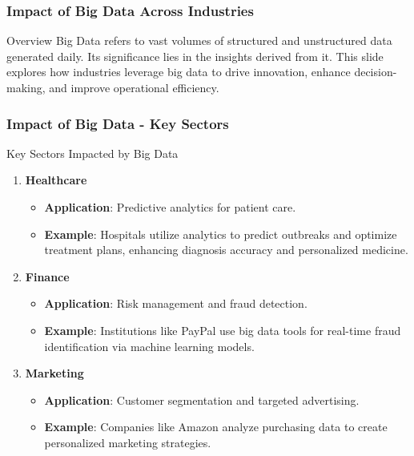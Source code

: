 \documentclass[aspectratio=169]{beamer}
\begin{document}
\begin{frame}[fragile]
    \frametitle{Impact of Big Data Across Industries}
    \begin{block}{Overview}
        Big Data refers to vast volumes of structured and unstructured data generated daily. Its significance lies in the insights derived from it. This slide explores how industries leverage big data to drive innovation, enhance decision-making, and improve operational efficiency.
    \end{block}
\end{frame}

\begin{frame}[fragile]
    \frametitle{Impact of Big Data - Key Sectors}
    \begin{block}{Key Sectors Impacted by Big Data}
        \begin{enumerate}
            \item \textbf{Healthcare}
                \begin{itemize}
                    \item \textbf{Application}: Predictive analytics for patient care.
                    \item \textbf{Example}: Hospitals utilize analytics to predict outbreaks and optimize treatment plans, enhancing diagnosis accuracy and personalized medicine.
                \end{itemize}
            \item \textbf{Finance}
                \begin{itemize}
                    \item \textbf{Application}: Risk management and fraud detection.
                    \item \textbf{Example}: Institutions like PayPal use big data tools for real-time fraud identification via machine learning models.
                \end{itemize}
            \item \textbf{Marketing}
                \begin{itemize}
                    \item \textbf{Application}: Customer segmentation and targeted advertising.
                    \item \textbf{Example}: Companies like Amazon analyze purchasing data to create personalized marketing strategies.
                \end{itemize}
        \end{enumerate}
    \end{block}
\end{frame}
\end{document}
